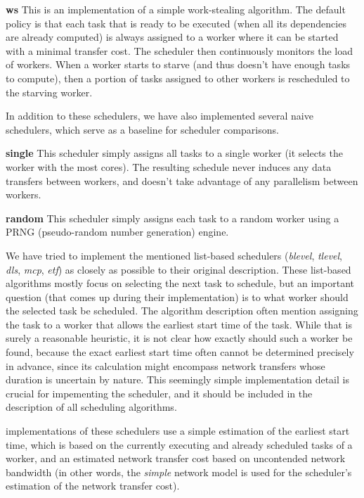 \noindent\textbf{ws}\quad
This is an implementation of a simple work-stealing algorithm. The default policy is that each task
that is ready to be executed (when all its dependencies are already computed) is always assigned to
a worker where it can be started with a minimal transfer cost. The scheduler then continuously
monitors the load of workers. When a worker starts to starve (and thus doesn't have enough tasks to
compute), then a portion of tasks assigned to other workers is rescheduled to the starving worker.

In addition to these schedulers, we have also implemented several naive schedulers, which serve as
a baseline for scheduler comparisons.

\noindent\textbf{single}\quad
This scheduler simply assigns all tasks to a single worker (it selects the worker with the most
cores). The resulting schedule never induces any data transfers between workers, and doesn't take
advantage of any parallelism between workers.

\noindent\textbf{random}\quad
This scheduler simply assigns each task to a random worker using a PRNG (pseudo-random number
generation) engine.

We have tried to implement the mentioned list-based schedulers (\emph{blevel}, \emph{tlevel},
\emph{dls}, \emph{mcp}, \emph{etf}) as closely as possible to their original description.
These list-based algorithms mostly focus on selecting the next task to schedule, but an important
question (that comes up during their implementation) is to what worker should the selected task
be scheduled. The algorithm description often mention assigning the task to a worker that allows
the earliest start time of the task. While that is surely a reasonable heuristic, it is not clear
how exactly should such a worker be found, because the exact earliest start time often cannot be
determined precisely in advance, since its calculation might encompass network transfers whose
duration is uncertain by nature. This seemingly simple implementation detail is crucial for
impementing the scheduler, and it should be included in the description of all scheduling algorithms.

\estee{} implementations of these schedulers use a simple estimation of the earliest start time, which
is based on the currently executing and already scheduled tasks of a worker, and an estimated
network transfer cost based on uncontended network bandwidth (in other words, the \emph{simple}
network model is used for the scheduler's estimation of the network transfer cost).

